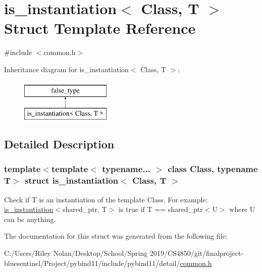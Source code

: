 \hypertarget{structis__instantiation}{}\section{is\+\_\+instantiation$<$ Class, T $>$ Struct Template Reference}
\label{structis__instantiation}


{\ttfamily \#include $<$common.\+h$>$}

Inheritance diagram for is\+\_\+instantiation$<$ Class, T $>$\+:\begin{figure}[H]
\begin{center}
\leavevmode
\includegraphics[height=2.000000cm]{structis__instantiation}
\end{center}
\end{figure}


\subsection{Detailed Description}
\subsubsection*{template$<$template$<$ typename... $>$ class Class, typename T$>$\newline
struct is\+\_\+instantiation$<$ Class, T $>$}

Check if T is an instantiation of the template {\ttfamily Class}. For example\+: {\ttfamily \mbox{\hyperlink{structis__instantiation}{is\+\_\+instantiation}}$<$shared\+\_\+ptr, T$>$} is true if {\ttfamily T == shared\+\_\+ptr$<$U$>$} where U can be anything. 

The documentation for this struct was generated from the following file\+:\begin{DoxyCompactItemize}
\item 
C\+:/\+Users/\+Riley Nolan/\+Desktop/\+School/\+Spring 2019/\+C\+S4850/git/finalproject-\/bluesentinel/\+Project/pybind11/include/pybind11/detail/\mbox{\hyperlink{detail_2common_8h}{common.\+h}}\end{DoxyCompactItemize}
